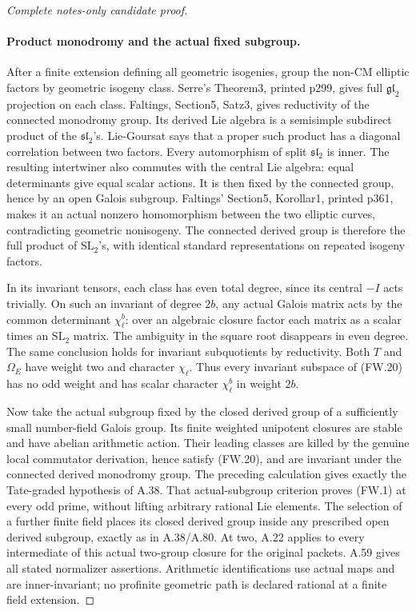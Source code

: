 \begin{proof}[Complete notes-only candidate proof]
\paragraph{Product monodromy and the actual fixed subgroup.}
After a finite extension defining all geometric isogenies, group
the non-CM elliptic factors by geometric isogeny class. Serre's
Theorem3, printed p299, gives full \(\mathfrak{gl}_2\) projection
on each class. Faltings, Section5, Satz3, gives reductivity of the
connected monodromy group. Its derived Lie algebra is a semisimple
subdirect product of the \(\mathfrak{sl}_2\)'s. Lie-Goursat says
that a proper such product has a diagonal correlation between two
factors. Every automorphism of split \(\mathfrak{sl}_2\) is inner.
The resulting intertwiner also commutes with the central Lie
algebra: equal determinants give equal scalar actions. It is then
fixed by the connected group, hence by an open Galois subgroup.
Faltings' Section5, Korollar1, printed p361, makes it an actual
nonzero homomorphism between the two elliptic curves, contradicting
geometric nonisogeny. The connected derived group is therefore the
full product of \(\mathrm{SL}_2\)'s, with identical standard
representations on repeated isogeny factors.

In its invariant tensors, each class has even total degree, since
its central \(-I\) acts trivially. On such an invariant of degree
\(2b\), any actual Galois matrix acts by the common determinant
\(\chi_\ell^b\): over an algebraic closure factor each matrix
as a scalar times an \(\mathrm{SL}_2\) matrix. The ambiguity in
the square root disappears in even degree. The same conclusion
holds for invariant subquotients by reductivity. Both \(T\) and
\(\Omega_E\) have weight two and character \(\chi_\ell\).
Thus every invariant subspace of (FW.20) has no odd weight and
has scalar character \(\chi_\ell^b\) in weight \(2b\).

Now take the actual subgroup fixed by the closed derived group
of a sufficiently small number-field Galois group. Its finite
weighted unipotent closures are stable and have abelian arithmetic
action. Their leading classes are killed by the genuine local
commutator derivation, hence satisfy (FW.20), and are invariant
under the connected derived monodromy group. The preceding
calculation gives exactly the Tate-graded hypothesis of A.38.
That actual-subgroup criterion proves (FW.1) at every odd prime,
without lifting arbitrary rational Lie elements. The selection of
a further finite field places its closed derived group inside any
prescribed open derived subgroup, exactly as in A.38/A.80.
At two, A.22 applies to every intermediate of this actual two-group
closure for the original packets. A.59 gives all stated normalizer
assertions. Arithmetic identifications use actual maps and are
inner-invariant; no profinite geometric path is declared rational
at a finite field extension.


\end{proof}
